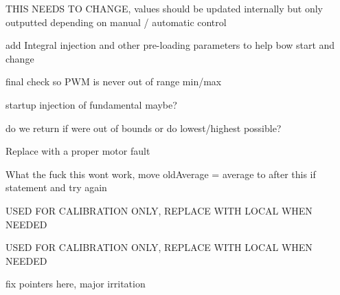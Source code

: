 
\begin{DoxyRefList}
\item[File \mbox{\hyperlink{bowcontrol_8cpp}{bowcontrol.cpp}} ]\label{todo__todo000001}%
%
THIS NEEDS TO CHANGE, values should be updated internally but only outputted depending on manual / automatic control  
\item[Member \mbox{\hyperlink{classbowControl_a51d03db7ff6ba45e3643b3cfb047c081}{bow\+Control\+::pid\+Control}} ()]\label{todo__todo000002}%
%
add Integral injection and other pre-\/loading parameters to help bow start and change 

final check so PWM is never out of range min/max 

startup injection of fundamental maybe?  
\item[Member \mbox{\hyperlink{classbowControl_af3c67773447df63befb6af1bfc978e03}{bow\+Control\+::set\+Harmonic}} (int \+\_\+harmonic)]\label{todo__todo000003}%
%
do we return if we\textquotesingle{}re out of bounds or do lowest/highest possible?  
\item[Member \mbox{\hyperlink{classbowControl_ac763e2c7400be2248ffad2e13462d60a}{bow\+Control\+::update\+String}} ()]\label{todo__todo000004}%
%
Replace with a proper motor fault  
\item[Member \mbox{\hyperlink{classbowIO_a4f7ef490b19cc4d9d6e3bd2e65d77061}{bow\+IO\+::average\+Freq}} ()]\label{todo__todo000005}%
%
What the fuck this wont work, move old\+Average = average to after this if statement and try again  
\item[Member \mbox{\hyperlink{structCalibrationData_a9f72d0c5443474d421b40c9ff16c6941}{Calibration\+Data\+::max\+Speed\+PWM}} ]\label{todo__todo000007}%
%
USED FOR CALIBRATION ONLY, REPLACE WITH LOCAL WHEN NEEDED  
\item[Member \mbox{\hyperlink{structCalibrationData_a4fee79f4cad856d28f6372abc3aba90a}{Calibration\+Data\+::min\+Speed\+PWM}} ]\label{todo__todo000006}%
%
USED FOR CALIBRATION ONLY, REPLACE WITH LOCAL WHEN NEEDED  
\item[Member \mbox{\hyperlink{classstringModule_a52a5b213e054d030023de05b46769555}{string\+Module\+::add\+Bow}} (char motor\+Rev\+Pin, char motor\+Voltage\+Pin, char motor\+DCDCEn, char tacho\+Pin, char current\+Sense\+Pin, char motor\+Fault\+Pin, char step\+En\+Pin, char step\+Dir\+Pin, char step\+Step\+Pin, Hardware\+Serial $\ast$step\+Serial\+Port, char step\+Home\+Sensor\+Pin, char step\+Correction\+Sensor\+Pin)]\label{todo__todo000009}%
%
fix pointers here, major irritation 
\end{DoxyRefList}